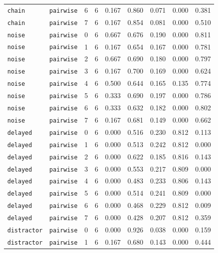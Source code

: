 \documentclass{article}
\begin{document}
\begin{center}
\begin{tabular}{lllcccccc}
\texttt{chain} & \texttt{pairwise} & 6 & 6 & 0.167 & 0.860 & 0.071 & 0.000 & 0.381 \\
\texttt{chain} & \texttt{pairwise} & 7 & 6 & 0.167 & 0.854 & 0.081 & 0.000 & 0.510 \\
\texttt{noise} & \texttt{pairwise} & 0 & 6 & 0.667 & 0.676 & 0.190 & 0.000 & 0.811 \\
\texttt{noise} & \texttt{pairwise} & 1 & 6 & 0.167 & 0.654 & 0.167 & 0.000 & 0.781 \\
\texttt{noise} & \texttt{pairwise} & 2 & 6 & 0.667 & 0.690 & 0.180 & 0.000 & 0.797 \\
\texttt{noise} & \texttt{pairwise} & 3 & 6 & 0.167 & 0.700 & 0.169 & 0.000 & 0.624 \\
\texttt{noise} & \texttt{pairwise} & 4 & 6 & 0.500 & 0.644 & 0.165 & 0.135 & 0.774 \\
\texttt{noise} & \texttt{pairwise} & 5 & 6 & 0.333 & 0.690 & 0.197 & 0.000 & 0.786 \\
\texttt{noise} & \texttt{pairwise} & 6 & 6 & 0.333 & 0.632 & 0.182 & 0.000 & 0.802 \\
\texttt{noise} & \texttt{pairwise} & 7 & 6 & 0.167 & 0.681 & 0.149 & 0.000 & 0.662 \\
\texttt{delayed} & \texttt{pairwise} & 0 & 6 & 0.000 & 0.516 & 0.230 & 0.812 & 0.113 \\
\texttt{delayed} & \texttt{pairwise} & 1 & 6 & 0.000 & 0.513 & 0.242 & 0.812 & 0.000 \\
\texttt{delayed} & \texttt{pairwise} & 2 & 6 & 0.000 & 0.622 & 0.185 & 0.816 & 0.143 \\
\texttt{delayed} & \texttt{pairwise} & 3 & 6 & 0.000 & 0.553 & 0.217 & 0.809 & 0.000 \\
\texttt{delayed} & \texttt{pairwise} & 4 & 6 & 0.000 & 0.483 & 0.233 & 0.806 & 0.143 \\
\texttt{delayed} & \texttt{pairwise} & 5 & 6 & 0.000 & 0.514 & 0.241 & 0.809 & 0.000 \\
\texttt{delayed} & \texttt{pairwise} & 6 & 6 & 0.000 & 0.468 & 0.229 & 0.812 & 0.009 \\
\texttt{delayed} & \texttt{pairwise} & 7 & 6 & 0.000 & 0.428 & 0.207 & 0.812 & 0.359 \\
\texttt{distractor} & \texttt{pairwise} & 0 & 6 & 0.000 & 0.926 & 0.038 & 0.000 & 0.159 \\
\texttt{distractor} & \texttt{pairwise} & 1 & 6 & 0.167 & 0.680 & 0.143 & 0.000 & 0.444 \\
\bottomrule
\end{tabular}
\end{center}
\end{document}
